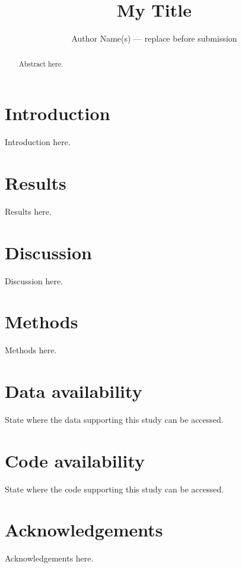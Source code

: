 \documentclass[12pt]{article}
\title{My Title}
\author{Author Name(s) --- replace before submission}
\date{}
\begin{document}
\maketitle

\begin{abstract}
Abstract here.
\end{abstract}

\section{Introduction}
\label{sec:introduction}
Introduction here.

\section{Results}
\label{sec:results}
Results here.

\section{Discussion}
\label{sec:discussion}
Discussion here.

\section{Methods}
\label{sec:methods}
Methods here.

\section*{Data availability}
State where the data supporting this study can be accessed.

\section*{Code availability}
State where the code supporting this study can be accessed.

\section*{Acknowledgements}
Acknowledgements here.
\end{document}
